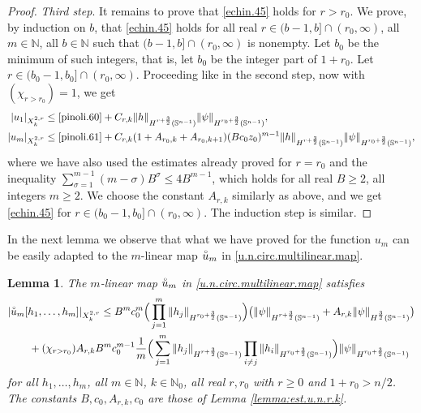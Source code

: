 \documentclass[10pt,reqno,a4paper]{article}
\numberwithin{equation}{section}
\theoremstyle{plain}
\newtheorem{lemma}[theorem]{Lemma}
\theoremstyle{definition}
\newcommand{\N}{{\mathbb N}}
\renewcommand{\S}{{\mathbb S}}
\begin{document}
\begin{proof}
\emph{Third step}. It remains to prove that \eqref{echin.45} holds for $r > r_0$. 
We prove, by induction on $b$, that \eqref{echin.45} holds for all real $r \in (b-1,b] \cap (r_0,\infty)$,
all $m \in \N$, all $b \in \N$ such that $(b-1,b] \cap (r_0,\infty)$ is nonempty. 
Let $b_0$ be the minimum of such integers, that is, let $b_0$ be the integer part of $1+r_0$. 
Let $r \in (b_0-1, b_0] \cap (r_0,\infty)$. 
Proceeding like in the second step, now with $(\chi_{r>r_0}) = 1$, we get 
\begin{align*}
|u_1|_{X^{2,r}_k} & \leq \eqref{pinoli.60} 
+ C_{r,k} \| h \|_{H^{r+\frac32}(\S^{n-1})} \| \psi \|_{H^{r_0+\frac32}(\S^{n-1})},
\\
|u_m|_{X^{2,r}_k} & \leq \eqref{pinoli.61} 
+ C_{r,k} (1 + A_{r_0,k} + A_{r_0, k+1}) (Bc_0z_0)^{m-1}
\| h \|_{H^{r+\frac32}(\S^{n-1})} \| \psi \|_{H^{r_0+\frac32}(\S^{n-1})}, 
\end{align*}
where we have also used the estimates already proved for $r=r_0$
and the inequality $\sum_{\sigma=1}^{m-1} (m-\sigma) B^\sigma \leq 4 B^{m-1}$, 
which holds for all real $B \geq 2$, all integers $m \geq 2$. 
We choose the constant $A_{r,k}$ similarly as above, 
and we get \eqref{echin.45} for $r \in (b_0-1,b_0] \cap (r_0,\infty)$. 
The induction step is similar. 
\end{proof}


In the next lemma we observe that what we have proved for the function $u_m$ 
can be easily adapted to the $m$-linear map $\accentset{\circ}{u}_m$
in \eqref{u.n.circ.multilinear.map}.

\begin{lemma} \label{lemma:est.u.n.r.k.multlinear}
The $m$-linear map $\accentset{\circ}{u}_m$ in \eqref{u.n.circ.multilinear.map} satisfies  
\begin{align} 
& | \accentset{\circ}{u}_m [h_1, \ldots, h_m] |_{X^{2,r}_k} 
\leq B^m c_0^m \Big( \prod_{j=1}^m \| h_j \|_{H^{r_0+\frac32}(\S^{n-1})} \Big)   
\big( \| \psi \|_{H^{r+\frac32}(\S^{n-1})} 
+ A_{r,k} \| \psi \|_{H^{\frac32}(\S^{n-1})} \big)  
\notag \\ & \qquad 
+ (\chi_{r > r_0}) A_{r,k} B^m c_0^{m-1} 
\frac{1}{m} \Big( \sum_{j=1}^m \| h_j \|_{H^{r+\frac32}(\S^{n-1})} 
\prod_{i \neq j} \| h_i \|_{H^{r_0+\frac32}(\S^{n-1})} \Big)   
\| \psi \|_{H^{r_0 + \frac32}(\S^{n-1})}
\label{echin.45.multilinear}
\end{align}
for all $h_1, \ldots, h_m$, 
all $m \in \N$, $k \in \N_0$, all real $r, r_0$ with $r \geq 0$ and $1+r_0>n/2$. 
The constants $B, c_0, A_{r,k}, c_0$ are those of Lemma \ref{lemma:est.u.n.r.k}.
\end{lemma}
\end{document}
